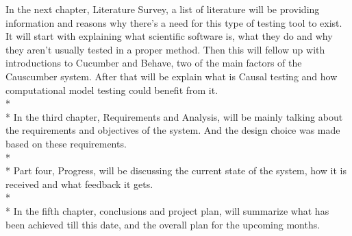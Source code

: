 In the next chapter, Literature Survey, a list of literature will be providing information and reasons why there’s a need for this type of testing tool to exist. It will start with explaining what scientific software is, what they do and why they aren’t usually tested in a proper method. Then this will fellow up with introductions to Cucumber and Behave, two of the main factors of the Causcumber system. After that will be explain what is Causal testing and how computational model testing could benefit from it.\\* \\* 
In the third chapter, Requirements and Analysis, will be mainly talking about the requirements and objectives of the system. And the design choice was made based on these requirements. \\* \\*
Part four, Progress, will be discussing the current state of the system, how it is received and what feedback it gets. \\* \\*
In the fifth chapter, conclusions and project plan, will summarize what has been achieved till this date, and the overall plan for the upcoming months.






